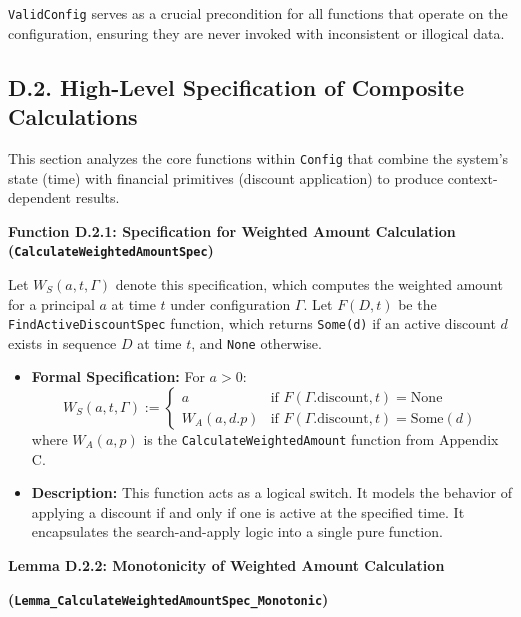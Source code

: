 \documentclass[
  english,
  onecolumn]{article}
\providecommand{\tightlist}{%
  \setlength{\itemsep}{0pt}\setlength{\parskip}{0pt}}
\begin{document}
\begin{itemize}
  \texttt{ValidConfig} serves as a crucial precondition for all
  functions that operate on the configuration, ensuring they are never
  invoked with inconsistent or illogical data.
\end{itemize}

\subsection{D.2. High-Level Specification of Composite
Calculations}\label{d.2.-high-level-specification-of-composite-calculations}

This section analyzes the core functions within \texttt{Config} that
combine the system's state (time) with financial primitives (discount
application) to produce context-dependent results.

\textbf{Function D.2.1: Specification for Weighted Amount Calculation
(\texttt{CalculateWeightedAmountSpec})}

Let \(W_S(a, t, \Gamma)\) denote this specification, which computes the
weighted amount for a principal \(a\) at time \(t\) under configuration
\(\Gamma\). Let \(F(D, t)\) be the \texttt{FindActiveDiscountSpec}
function, which returns \texttt{Some(d)} if an active discount \(d\)
exists in sequence \(D\) at time \(t\), and \texttt{None} otherwise.

\begin{itemize}
\tightlist
\item
  \textbf{Formal Specification:} For \(a > 0\): \[
  W_S(a, t, \Gamma) := \begin{cases}
  a & \text{if } F(\Gamma.\text{discount}, t) = \text{None} \\
  W_A(a, d.p) & \text{if } F(\Gamma.\text{discount}, t) = \text{Some}(d)
  \end{cases}
  \] where \(W_A(a, p)\) is the \texttt{CalculateWeightedAmount}
  function from Appendix C.
\item
  \textbf{Description:} This function acts as a logical switch. It
  models the behavior of applying a discount if and only if one is
  active at the specified time. It encapsulates the search-and-apply
  logic into a single pure function.
\end{itemize}

\textbf{Lemma D.2.2: Monotonicity of Weighted Amount Calculation}

\textbf{(\texttt{Lemma\_CalculateWeightedAmountSpec\_Monotonic})}
\end{document}
